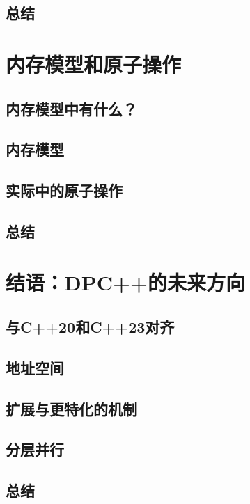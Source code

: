 \documentclass[11pt,a4paper,UTF8]{ctexart}
\begin{document}
		\subsection{总结}
	\section{内存模型和原子操作}
		\subsection{内存模型中有什么？}
		\subsection{内存模型}
		\subsection{实际中的原子操作}
		\subsection{总结}
	\section{结语：DPC++的未来方向}
		\subsection{与C++20和C++23对齐}
		\subsection{地址空间}
		\subsection{扩展与更特化的机制}
		\subsection{分层并行}
		\subsection{总结}
\end{document}

